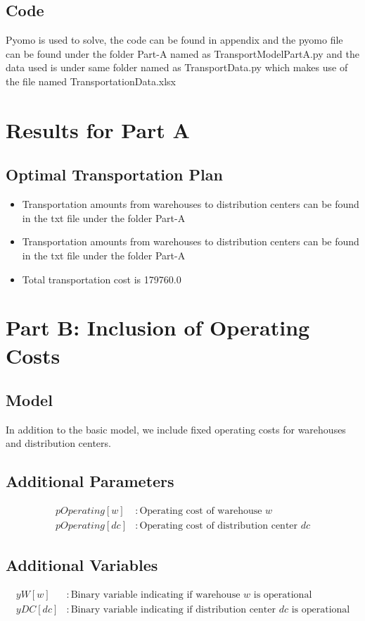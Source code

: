 \documentclass[12pt]{article}
\begin{document}
\subsection*{Code}
Pyomo is used to solve, the code can be found in appendix and the pyomo file can be found under the folder Part-A named as TransportModelPartA.py and the data used is under same folder named as TransportData.py which makes use of the file named TransportationData.xlsx

\section*{Results for Part A}
\subsection*{Optimal Transportation Plan}
\begin{itemize}
    \item Transportation amounts from warehouses to distribution centers can be found in the txt file under the folder Part-A
    \item Transportation amounts from warehouses to distribution centers can be found in the txt file under the folder Part-A
    \item Total transportation cost is 179760.0
\end{itemize}

\section*{Part B: Inclusion of Operating Costs}
\subsection*{Model}
In addition to the basic model, we include fixed operating costs for warehouses and distribution centers.

\subsection*{Additional Parameters}
\begin{align*}
pOperating[w] & : \text{Operating cost of warehouse } w \\
pOperating[dc] & : \text{Operating cost of distribution center } dc
\end{align*}

\subsection*{Additional Variables}
\begin{align*}
yW[w] & : \text{Binary variable indicating if warehouse } w \text{ is operational} \\
yDC[dc] & : \text{Binary variable indicating if distribution center } dc \text{ is operational}
\end{align*}
\end{document}
